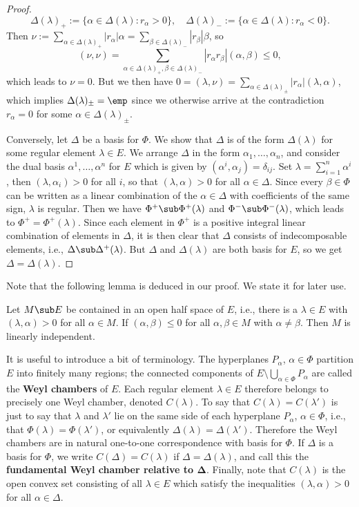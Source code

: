 \begin{proof}
\[\Delta(\lambda)_+:=\{\alpha\in\Delta(\lambda):r_\alpha>0\},\quad\Delta(\lambda)_-:=\{\alpha\in\Delta(\lambda):r_\alpha<0\}.\]
Then $\nu:=\sum_{\alpha\in\Delta(\lambda)_+}|r_\alpha|\alpha=\sum_{\beta\in\Delta(\lambda)_-}|r_\beta|\beta$, so
\[(\nu,\nu)=\sum_{\alpha\in\Delta(\lambda)_+,\beta\in\Delta(\lambda)_-}|r_\alpha r_\beta|(\alpha,\beta)\leq 0,\]
which leads to $\nu=0$. But we then have $0=(\lambda,\nu)=\sum_{\alpha\in \Delta(\lambda)_\pm}|r_\alpha|(\lambda,\alpha)$, which implies $\Delta(\lambda)_\pm=\emp$ since we otherwise arrive at the contradiction $r_\alpha=0$ for some $\alpha\in\Delta(\lambda)_\pm$.\par
Conversely, let $\Delta$ be a basis for $\Phi$. We show that $\Delta$ is of the form $\Delta(\lambda)$ for some regular element $\lambda\in E$. We arrange $\Delta$ in the form $\alpha_1,\dots,\alpha_n$, and consider the dual basis $\alpha^1,\dots,\alpha^n$ for $E$ which is given by $(\alpha^i,\alpha_j)=\delta_{ij}$. Set $\lambda=\sum_{i=1}^{n}\alpha^i$, then $(\lambda,\alpha_i)>0$ for all $i$, so that $(\lambda,\alpha)>0$ for all $\alpha\in\Delta$. Since every $\beta\in\Phi$ can be written as a linear combination of the $\alpha\in\Delta$ with coefficients of the same sign, $\lambda$ is regular. Then we have $\Phi^+\sub\Phi^+(\lambda)$ and $\Phi^-\sub\Phi^-(\lambda)$, which leads to $\Phi^+=\Phi^+(\lambda)$. Since each element in $\Phi^+$ is a positive integral linear combination of elements in $\Delta$, it is then clear that $\Delta$ consists of indecomposable elements, i.e., $\Delta\sub\Delta^+(\lambda)$. But $\Delta$ and $\Delta(\lambda)$ are both basis for $E$, so we get $\Delta=\Delta(\lambda)$.
\end{proof}
Note that the following lemma is deduced in our proof. We state it for later use.
\begin{lemma}\label{root system linear independent if positive}
Let $M\sub E$ be contained in an open half space of $E$, i.e., there is a $\lambda\in E$ with $(\lambda,\alpha)>0$ for all $\alpha\in M$. If $(\alpha,\beta)\leq 0$ for all $\alpha,\beta\in M$ with $\alpha\neq\beta$. Then $M$ is linearly independent.
\end{lemma}
It is useful to introduce a bit of terminology. The hyperplanes $P_\alpha$, $\alpha\in\Phi$ partition $E$ into finitely many regions; the connected components of $E\setminus\bigcup_{\alpha\in\Phi}P_\alpha$ are called the \textbf{Weyl chambers} of $E$. Each regular element $\lambda\in E$ therefore belongs to precisely one Weyl chamber, denoted $C(\lambda)$. To say that $C(\lambda)=C(\lambda')$ is just to say that $\lambda$ and $\lambda'$ lie on the same side of each hyperplane $P_\alpha$, $\alpha\in\Phi$, i.e., that $\Phi(\lambda)=\Phi(\lambda')$, or equivalently $\Delta(\lambda)=\Delta(\lambda')$. Therefore the Weyl chambers are in natural one-to-one correspondence with basis for $\Phi$. If $\Delta$ is a basis for $\Phi$, we write $C(\Delta)=C(\lambda)$ if $\Delta=\Delta(\lambda)$, and call this the \textbf{fundamental Weyl chamber relative to $\bm{\Delta}$}. Finally, note that $C(\lambda)$ is the open convex set consisting of all $\lambda\in E$ which satisfy the inequalities $(\lambda,\alpha)>0$ for all $\alpha\in\Delta$.
